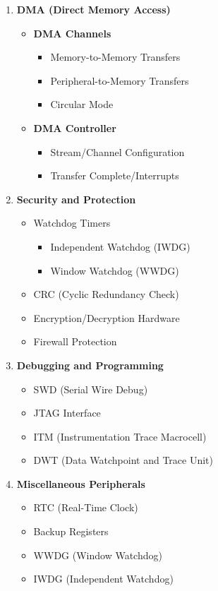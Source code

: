\documentclass{article}
\begin{document}
\begin{enumerate}[label=\textbf{\arabic*.}]
    \item \textbf{DMA (Direct Memory Access)}
    \begin{itemize}
        \item \textbf{DMA Channels}
        \begin{itemize}
            \item Memory-to-Memory Transfers
            \item Peripheral-to-Memory Transfers
            \item Circular Mode
        \end{itemize}
        \item \textbf{DMA Controller}
        \begin{itemize}
            \item Stream/Channel Configuration
            \item Transfer Complete/Interrupts
        \end{itemize}
    \end{itemize}
    
    \item \textbf{Security and Protection}
    \begin{itemize}
        \item Watchdog Timers
        \begin{itemize}
            \item Independent Watchdog (IWDG)
            \item Window Watchdog (WWDG)
        \end{itemize}
        \item CRC (Cyclic Redundancy Check)
        \item Encryption/Decryption Hardware
        \item Firewall Protection
    \end{itemize}
    
    \item \textbf{Debugging and Programming}
    \begin{itemize}
        \item SWD (Serial Wire Debug)
        \item JTAG Interface
        \item ITM (Instrumentation Trace Macrocell)
        \item DWT (Data Watchpoint and Trace Unit)
    \end{itemize}
    
    \item \textbf{Miscellaneous Peripherals}
    \begin{itemize}
        \item RTC (Real-Time Clock)
        \item Backup Registers
        \item WWDG (Window Watchdog)
        \item IWDG (Independent Watchdog)
    \end{itemize}
    
\end{enumerate}
\end{document}

